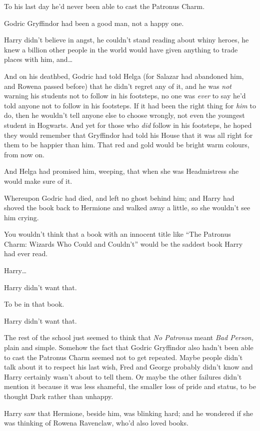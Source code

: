 To his last day he'd never been able to cast the Patronus Charm.

Godric Gryffindor had been a good man, not a happy one.

Harry didn't believe in angst, he couldn't stand reading about whiny
heroes, he knew a billion other people in the world would have given
anything to trade places with him, and\ldots{}

And on his deathbed, Godric had told Helga (for Salazar had abandoned
him, and Rowena passed before) that he didn't regret any of it, and he
was \emph{not} warning his students not to follow in his footsteps, no
one was \emph{ever} to say he'd told anyone not to follow in his
footsteps. If it had been the right thing for \emph{him} to do, then he
wouldn't tell anyone else to choose wrongly, not even the youngest
student in Hogwarts. And yet for those who \emph{did} follow in his
footsteps, he hoped they would remember that Gryffindor had told his
House that it was all right for them to be happier than him. That red
and gold would be bright warm colours, from now on.

And Helga had promised him, weeping, that when she was Headmistress she
would make sure of it.

Whereupon Godric had died, and left no ghost behind him; and Harry had
shoved the book back to Hermione and walked away a little, so she
wouldn't see him crying.

You wouldn't think that a book with an innocent title like ``The
Patronus Charm: Wizards Who Could and Couldn't'' would be the saddest
book Harry had ever read.

Harry\ldots{}

Harry didn't want that.

To be in that book.

Harry didn't want that.

The rest of the school just seemed to think that \emph{No Patronus}
meant \emph{Bad Person,} plain and simple. Somehow the fact that Godric
Gryffindor also hadn't been able to cast the Patronus Charm seemed not
to get repeated. Maybe people didn't talk about it to respect his last
wish, Fred and George probably didn't know and Harry certainly wasn't
about to tell them. Or maybe the other failures didn't mention it
because it was less shameful, the smaller loss of pride and status, to
be thought Dark rather than unhappy.

Harry saw that Hermione, beside him, was blinking hard; and he wondered
if she was thinking of Rowena Ravenclaw, who'd also loved books.

